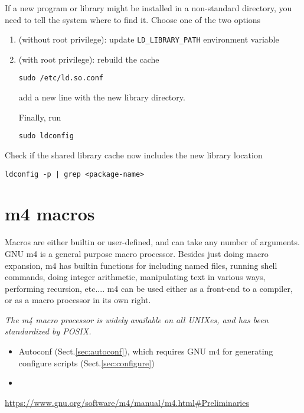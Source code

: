 If a new program or library might be installed in a non-standard
directory, you need to tell the system where to find it. Choose one of the two
options
\begin{enumerate}
  \item (without root privilege): update \verb!LD_LIBRARY_PATH! environment
  variable
  
  \item (with root privilege): rebuild the cache
  
\begin{verbatim}
sudo /etc/ld.so.conf
\end{verbatim}
add a new line with the new library directory.

Finally, run
\begin{verbatim}
sudo ldconfig
\end{verbatim} 

\end{enumerate}
Check if the shared library cache now includes the new library location
\begin{verbatim}
ldconfig -p | grep <package-name>
\end{verbatim}



\section{m4 macros}
\label{sec:m4}

Macros are either builtin or user-defined, and can take any number of arguments.
GNU m4 is a general purpose macro processor. Besides just doing macro expansion,
m4 has builtin functions for including named files, running shell commands,
doing integer arithmetic, manipulating text in various ways, performing
recursion, etc.... m4 can be used either as a front-end to a compiler, or as a
macro processor in its own right.

{\it The m4 macro processor is widely available on all UNIXes, and has been
standardized by POSIX.}
\begin{itemize}
  \item  Autoconf (Sect.\ref{sec:autoconf}), which requires GNU m4 for
  generating configure scripts (Sect.\ref{sec:configure})
  
  \item 
\end{itemize}

\url{https://www.gnu.org/software/m4/manual/m4.html#Preliminaries}



